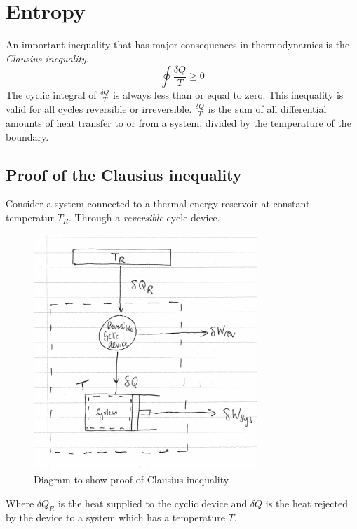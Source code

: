 \documentclass[class=report, crop=false, 12pt,a4paper]{standalone}
\numberwithin{equation}{section}
\begin{document}
\section{Entropy}
An important inequality that has major consequences in thermodynamics is the \emph{Clausius inequality}.
\begin{equation}
  \oint \frac{\delta Q}{T} \geq 0 
\end{equation}
The cyclic integral of \( \frac{\delta Q}{T} \) is always less than or equal to zero. This inequality is valid for all cycles reversible or irreversible. \( \frac{\delta Q}{T} \) is the sum of all differential amounts of heat transfer to or from a system, divided by the temperature of the boundary.
\subsection{Proof of the Clausius inequality}
Consider a system connected to a thermal energy reservoir at constant temperatur \( T_R \). Through a \emph{reversible} cycle device.
\begin{figure}
  \centering
  \includegraphics[width = 0.75\textwidth]{../img/ClausiusDiagram}
  \caption{Diagram to show proof of Clausius inequality}
\end{figure}
Where \( \delta Q_R \) is the heat supplied to the cyclic device and \( \delta Q \) is the heat rejected by the device to a system which has a temperature \(T\).
\end{document}
